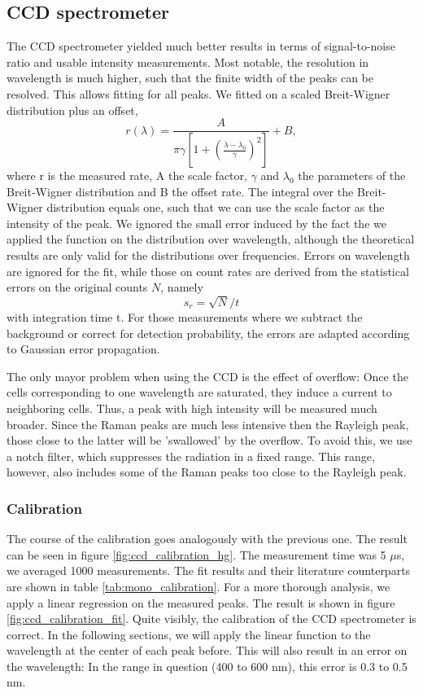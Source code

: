 \subsection{CCD spectrometer}
The CCD spectrometer yielded much better results in terms of signal-to-noise ratio and usable intensity measurements. 
Most notable, the resolution in wavelength is much higher, such that the finite width of the peaks can be resolved.
This allows fitting for all peaks. We fitted on a scaled Breit-Wigner distribution plus an offset, 
\begin{equation}
    r(\lambda) = \frac{A}{\pi \gamma \left[1 + \left(\frac{\lambda - \lambda_0}{\gamma}\right)^2\right]} + B, 
\end{equation} 
where r is the measured rate, A the scale factor, $\gamma$ and $\lambda_0$ the parameters of the Breit-Wigner 
distribution and B the offset rate. The integral over the Breit-Wigner distribution equals one, such that we can use the 
scale factor as the intensity of the peak. 
We ignored the small error induced by the fact the we applied the function on the distribution over wavelength, although 
the theoretical results are only valid for the distributions over frequencies. Errors on wavelength are ignored 
for the fit, while those on count rates are derived from the statistical errors on the original counts $N$, namely 
\begin{equation}
    s_r = \sqrt{N} / t
\end{equation}
with integration time t. For those measurements where we subtract the background or correct for detection probability, 
the errors are adapted according to Gaussian error propagation. 

The only mayor problem when using the CCD is the effect of overflow: Once the cells corresponding to one wavelength 
are saturated, they induce a current to neighboring cells. Thus, a peak with high intensity will be measured much 
broader. Since the Raman peaks are much less intensive then the Rayleigh peak, those close to the latter will be 
'swallowed' by the overflow. To avoid this, we use a notch filter, which suppresses the radiation in a fixed range.
This range, however, also includes some of the Raman peaks too close to the Rayleigh peak. 

\subsubsection{Calibration}
The course of the calibration goes analogously with the previous one. The result can be seen in figure 
\ref{fig:ccd_calibration_hg}. The measurement time was 5 $\mu$s, we averaged 1000 measurements. 
The fit results and their literature counterparts are shown in table \ref{tab:mono_calibration}.  
For a more thorough analysis, we apply a linear regression on the measured peaks. The result is shown in 
figure \ref{fig:ccd_calibration_fit}. Quite visibly, the calibration of the CCD spectrometer is correct. 
In the following sections, we will apply the linear function to the wavelength at the center of each peak before. 
This will also result in an error on the wavelength: In the range in question (400 to 600 nm), this error is 
0.3 to 0.5 nm. 

